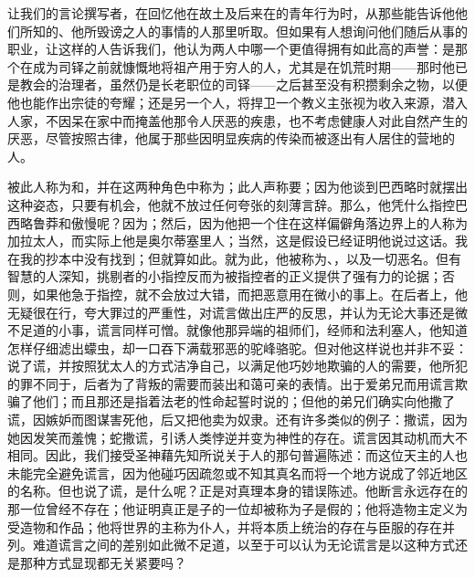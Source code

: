 让我们的言论撰写者，在回忆他在故土及后来在的青年行为时，从那些能告诉他他们所知的、他所毁谤之人的事情的人那里听取。但如果有人想询问他们随后从事的职业，让这样的人告诉我们，他认为两人中哪一个更值得拥有如此高的声誉：是那个在成为司铎之前就慷慨地将祖产用于穷人的人，尤其是在饥荒时期——那时他已是教会的治理者，虽然仍是长老职位的司铎——之后甚至没有积攒剩余之物，以便他也能作出宗徒的夸耀；还是另一个人，将捍卫一个教义主张视为收入来源，潜入人家，不因呆在家中而掩盖他那令人厌恶的疾患，也不考虑健康人对此自然产生的厌恶，尽管按照古律，他属于那些因明显疾病的传染而被逐出有人居住的营地的人。\par

被此人称为和，并在这两种角色中称为；此人声称要；因为他谈到巴西略时就摆出这种姿态，只要有机会，他就不放过任何夸张的刻薄言辞。那么，他凭什么指控巴西略鲁莽和傲慢呢？因为；然后，因为他把一个住在这样偏僻角落边界上的人称为加拉太人，而实际上他是奥尔蒂塞里人；当然，这是假设已经证明他说过这话。我在我的抄本中没有找到；但就算如此。就为此，他被称为、，以及一切恶名。但有智慧的人深知，挑剔者的小指控反而为被指控者的正义提供了强有力的论据；否则，如果他急于指控，就不会放过大错，而把恶意用在微小的事上。在后者上，他无疑很在行，夸大罪过的严重性，对谎言做出庄严的反思，并认为无论大事还是微不足道的小事，谎言同样可憎。就像他那异端的祖师们，经师和法利塞人，他知道怎样仔细滤出蠓虫，却一口吞下满载邪恶的驼峰骆驼。但对他这样说也并非不妥：说了谎，并按照犹太人的方式洁净自己，以满足他巧妙地欺骗的人的需要，他所犯的罪不同于，后者为了背叛的需要而装出和蔼可亲的表情。出于爱弟兄而用谎言欺骗了他们；而且那还是指着法老的性命起誓时说的；但他的弟兄们确实向他撒了谎，因嫉妒而图谋害死他，后又把他卖为奴隶。还有许多类似的例子：撒谎，因为她因发笑而羞愧；蛇撒谎，引诱人类悖逆并变为神性的存在。谎言因其动机而大不相同。因此，我们接受圣神藉先知所说关于人的那句普遍陈述：而这位天主的人也未能完全避免谎言，因为他碰巧因疏忽或不知其真名而将一个地方说成了邻近地区的名称。但也说了谎，是什么呢？正是对真理本身的错误陈述。他断言永远存在的那一位曾经不存在；他证明真正是子的一位却被称为子是假的；他将造物主定义为受造物和作品；他将世界的主称为仆人，并将本质上统治的存在与臣服的存在并列。难道谎言之间的差别如此微不足道，以至于可以认为无论谎言是以这种方式还是那种方式显现都无关紧要吗？\par

